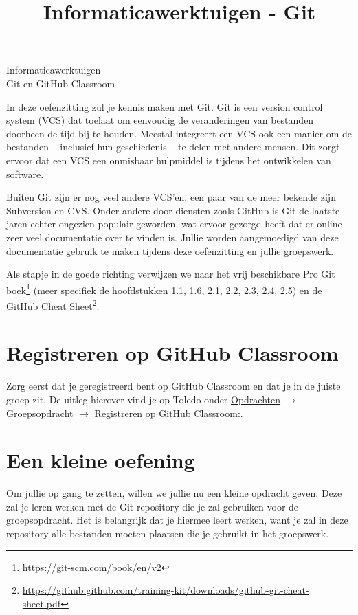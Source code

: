 \documentclass[a4paper]{article}
\title{Informaticawerktuigen - Git}
\begin{document}
\begin{center}
  \huge Informaticawerktuigen \\
  \Huge Git en GitHub Classroom \\
\end{center}
\vspace{1em}

In deze oefenzitting zul je kennis maken met Git.
Git is een version control system (VCS) dat toelaat om eenvoudig de veranderingen van bestanden doorheen de tijd bij te houden.
Meestal integreert een VCS ook een manier om de bestanden – inclusief hun geschiedenis – te delen met andere mensen.
Dit zorgt ervoor dat een VCS een onmisbaar hulpmiddel is tijdens het ontwikkelen van software.

Buiten Git zijn er nog veel andere VCS’en, een paar van de meer bekende zijn Subversion en CVS.
Onder andere door diensten zoals GitHub is Git de laatste jaren echter ongezien populair geworden, wat ervoor gezorgd heeft dat er online zeer veel documentatie over te vinden is.
Jullie worden aangemoedigd van deze documentatie gebruik te maken tijdens deze oefenzitting en jullie groepswerk.

Als stapje in de goede richting verwijzen we naar het vrij beschikbare Pro Git boek\footnote{\url{https://git-scm.com/book/en/v2}} (meer specifiek de hoofdstukken 1.1, 1.6, 2.1, 2.2, 2.3, 2.4, 2.5) en de GitHub Cheat Sheet\footnote{\url{https://github.github.com/training-kit/downloads/github-git-cheat-sheet.pdf}}.

\section{Registreren op GitHub Classroom}

Zorg eerst dat je geregistreerd bent op GitHub Classroom en dat je in de juiste groep zit.
De uitleg hierover vind je op Toledo onder \underline{Opdrachten} $\rightarrow$ \underline{Groepsopdracht} $\rightarrow$ \underline{Registreren op GitHub Classroom:}.


\section{Een kleine oefening}
Om jullie op gang te zetten, willen we jullie nu een kleine opdracht geven.
Deze zal je leren werken met de Git repository die je zal gebruiken voor de groepsopdracht.
Het is belangrijk dat je hiermee leert werken, want je zal in deze repository alle bestanden moeten plaatsen die je gebruikt in het groepswerk.
\end{document}
